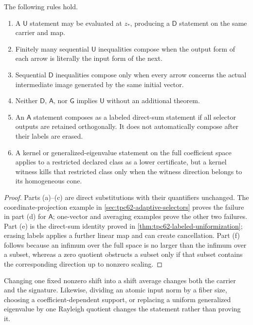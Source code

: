 \begin{proposition}
\label{prop:tpc62-safe-signature-rules}
The following rules hold.
\begin{enumerate}[label=\textup{(\alph*)},leftmargin=3em]
 \item A \(\mathsf U\) statement may be evaluated at \(z_*\), producing a
       \(\mathsf D\) statement on the same carrier and map.
 \item Finitely many sequential \(\mathsf U\) inequalities compose when
       the output form of each arrow is literally the input form of the
       next.
 \item Sequential \(\mathsf D\) inequalities compose only when every arrow
       concerns the actual intermediate image generated by the same initial
       vector.
 \item Neither \(\mathsf D\), \(\mathsf A\), nor \(\mathsf G\) implies
       \(\mathsf U\) without an additional theorem.
 \item An \(\mathsf A\) statement composes as a labeled direct-sum
       statement if all selector outputs are retained orthogonally.  It does
       not automatically compose after their labels are erased.
 \item A kernel or generalized-eigenvalue statement on the full coefficient
       space applies to a restricted declared class as a lower certificate,
       but a kernel witness kills that restricted class only when the witness
       direction belongs to its homogeneous cone.
\end{enumerate}
\end{proposition}

\begin{proof}
Parts (a)--(c) are direct substitutions with their quantifiers unchanged.
The coordinate-projection example in
\cref{sec:tpc62-adaptive-selectors} proves the failure in part (d) for
\(\mathsf A\); one-vector and averaging examples prove the other two
failures.  Part (e) is the direct-sum identity proved in
\cref{thm:tpc62-labeled-uniformization}; erasing labels applies a further
linear map and can create cancellation.  Part (f) follows because an
infimum over the full space is no larger than the infimum over a subset,
whereas a zero quotient obstructs a subset only if that subset contains the
corresponding direction up to nonzero scaling.
\end{proof}

Changing one fixed nonzero shift into a shift average changes both the
carrier and the signature.  Likewise, dividing an atomic input norm by a
fiber size, choosing a coefficient-dependent support, or replacing a
uniform generalized eigenvalue by one Rayleigh quotient changes the
statement rather than proving it.

